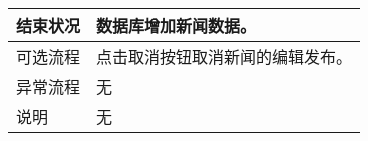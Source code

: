 \begin{table}[htbp]
\begin{tabular}{|l|l|l|l|}
        \hline
        结束状况                          & \multicolumn{3}{l|}{数据库增加新闻数据。    }                                                                                                                               \\
        \hline
        可选流程                          & \multicolumn{3}{l|}{点击取消按钮取消新闻的编辑发布。 }                                                                                                                      \\
        \hline
        异常流程                          & \multicolumn{3}{l|}{无}                                                                                                                                                     \\
        \hline
        说明                              & \multicolumn{3}{l|}{无}                                                                                                                                                     \\
        \hline
    \end{tabular}
\end{table}

